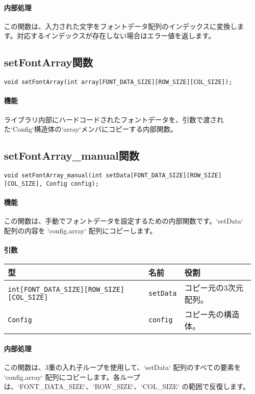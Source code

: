 \documentclass[uplatex]{jsarticle}
\begin{document}
\paragraph{内部処理}
この関数は、入力された文字をフォントデータ配列のインデックスに変換します。対応するインデックスが存在しない場合はエラー値を返します。

\subsection{setFontArray関数}
\texttt{void setFontArray(int array[FONT\_DATA\_SIZE][ROW\_SIZE][COL\_SIZE]);}
\paragraph{機能}
ライブラリ内部にハードコードされたフォントデータを、引数で渡された`Config`構造体の`array`メンバにコピーする内部関数。

\subsection{setFontArray\_manual関数}
\texttt{void setFontArray\_manual(int setData[FONT\_DATA\_SIZE][ROW\_SIZE][COL\_SIZE], Config config);}
\paragraph{機能}
この関数は、手動でフォントデータを設定するための内部関数です。`setData` 配列の内容を `config.array` 配列にコピーします。

\paragraph{引数}
\begin{center}
    \begin{tabular}{|l|l|p{7.5cm}|}
        \hline
        \textbf{型} & \textbf{名前} & \textbf{役割} \\ \hline
        \texttt{int[FONT\_DATA\_SIZE][ROW\_SIZE][COL\_SIZE]} & \texttt{setData} & コピー元の3次元配列。 \\ \hline
        \texttt{Config} & \texttt{config} & コピー先の構造体。 \\ \hline
    \end{tabular}
\end{center}

\paragraph{内部処理}
この関数は、3重の入れ子ループを使用して、`setData` 配列のすべての要素を `config.array` 配列にコピーします。各ループは、`FONT\_DATA\_SIZE`、`ROW\_SIZE`、`COL\_SIZE` の範囲で反復します。
\end{document}
